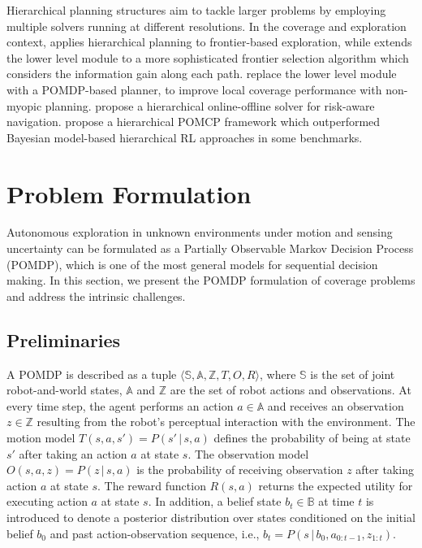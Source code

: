\documentclass[letterpaper]{article} %
\newcommand{\phdone}[1]{} %
\begin{document}
\phdone{Large scale--Hierarchical approaches}
Hierarchical planning structures \cite{kaelbling2011planning} aim to tackle larger problems by employing multiple solvers running at different resolutions.  
%
In the coverage and exploration context, \citet{umari2017autonomous} applies hierarchical planning to frontier-based exploration, while  \cite{dang2019explore} extends the lower level module to a more sophisticated frontier selection algorithm which considers the information gain along each path. \citet{Lauri2016planning} replace the lower level module with a POMDP-based planner, to improve local coverage performance with non-myopic planning. \citet{kim2019bi} propose a hierarchical online-offline solver for risk-aware navigation. \citet{vien2015hierarchical} propose a hierarchical POMCP framework which outperformed Bayesian model-based hierarchical RL approaches in some benchmarks.


\section{Problem Formulation}
\label{sec:formulation}

Autonomous exploration in unknown environments under motion and sensing uncertainty can be formulated as a Partially Observable Markov Decision Process (POMDP), which is one of the most general models for sequential decision making.
In this section, we present the POMDP formulation of coverage problems and address the intrinsic challenges.

\subsection{Preliminaries}
\phdone{POMDP Elements}
A POMDP is described as a tuple $\langle \mathbb{S}, \mathbb{A}, \mathbb{Z}, T, O, R \rangle$, where $\mathbb{S}$ is the set of joint robot-and-world states, $\mathbb{A}$ and $\mathbb{Z}$ are the set of robot actions and observations.
At every time step, the agent performs an action $a \in \mathbb{A}$ and receives an observation $z \in \mathbb{Z}$ resulting from the robot's perceptual interaction with the environment.
The motion model $T(s, a, s') = P(s'\,|\,s, a)$ defines the probability of being at state $s'$ after taking an action $a$ at state $s$.
The observation model $O(s, a, z) = P(z\,|\,s, a)$ is the probability of receiving observation $z$ after taking action $a$ at state $s$.
The reward function $R(s, a)$ returns the expected utility for executing action $a$ at state $s$.
In addition, a belief state $b_t \in \mathbb{B}$ at time $t$ is introduced to denote a posterior distribution over states conditioned on the initial belief $b_0$ and past action-observation sequence, i.e., $b_{t} = P(s \,|\, b_0, a_{0:t-1}, z_{1:t})$.
\end{document}
